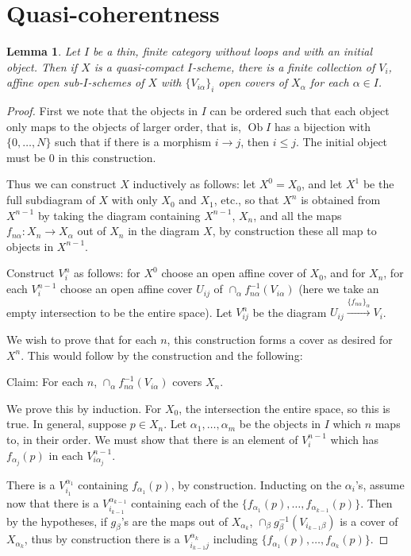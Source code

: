 \documentclass{amsart}
\newtheorem{lemma}[theorem]{Lemma}
\theoremstyle{definition}
\DeclareMathOperator{\Ob}{Ob}
\begin{document}
	
\section{Quasi-coherentness}
	
\begin{lemma}
	\label{lem:affinecover}
	Let $I$ be a thin, finite category without loops and with an initial object.
	Then if $X$ is a quasi-compact $I$-scheme, there is a finite collection of $V_{i}$, affine open sub-$I$-schemes of $X$ with $\{V_{i\alpha}\}_i$ open covers of $X_\alpha$ for each $\alpha \in I$.
\end{lemma}

\begin{proof}
	First we note that the objects in $I$ can be ordered such that each object only maps to the objects of larger order, that is, $\Ob I$ has a bijection with $\{0, \dots, N\}$ such that if there is a morphism $i \rightarrow j$, then $i \leq j$.
	The initial object must be 0 in this construction.
	
	Thus we can construct $X$ inductively as follows: let $X^0 = X_0$, and let $X^1$ be the full subdiagram of $X$ with only $X_0$ and $X_1$, etc., so that $X^n$ is obtained from $X^{n-1}$ by taking the diagram containing $X^{n-1}$, $X_n$, and all the maps $f_{n\alpha}:X_n \rightarrow X_\alpha$ out of $X_n$ in the diagram $X$, by construction these all map to objects in $X^{n-1}$.
	
	Construct $V_i^n$ as follows: for $X^0$ choose an open affine cover of $X_0$, and for $X_n$, for each $V_i^{n-1}$ choose an open affine cover $U_{ij}$ of $\cap_\alpha f_{n\alpha}^{-1}(V_{i\alpha})$ (here we take an empty intersection to be the entire space).
	Let $V_{ij}^n$ be the diagram $U_{ij} \xrightarrow{\{f_{n\alpha}\}_\alpha} V_i$.
	
	We wish to prove that for each $n$, this construction forms a cover as desired for $X^n$.
	This would follow by the construction and the following:
	
	Claim: For each $n$, $\cap_\alpha f_{n\alpha}^{-1}(V_{i\alpha})$ covers $X_n$.
	
	We prove this by induction.
	For $X_0$, the intersection the entire space, so this is true.
	In general, suppose $p \in X_n$.
	Let $\alpha_1, \dots, \alpha_m$ be the objects in $I$ which $n$ maps to, in their order.
	We must show that there is an element of $V_i^{n-1}$ which has $f_{\alpha_j}(p)$ in each $V_{i \alpha_j}^{n-1}$.
	
	There is a $V_{i_1}^{\alpha_1}$ containing $f_{\alpha_1}(p)$, by construction.
	Inducting on the $\alpha_i$'s, assume now that there is a $V_{i_{k-1}}^{\alpha_{k-1}}$ containing each of the $\{f_{\alpha_1}(p), \dots, f_{\alpha_{k-1}}(p)\}$.
	Then by the hypotheses, if $g_\beta$'s are the maps out of $X_{\alpha_k}$, $\cap_\beta g_{\beta}^{-1}(V_{i_{k-1}\beta})$ is a cover of $X_{\alpha_k}$, thus by construction there is a $V_{i_{k-1}j}^{\alpha_k}$ including $\{f_{\alpha_1}(p), \dots, f_{\alpha_{k}}(p)\}$.
\end{proof}
\end{document}

